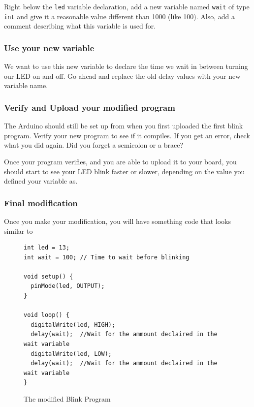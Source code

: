 \documentclass[11pt,a4paper]{article}
\begin{document}
Right below the \texttt{led} variable declaration, add a new variable named \texttt{wait} of type \texttt{int} and give it a reasonable value different than 1000 (like 100).  Also, add a comment describing what this variable is used for.

\subsubsection{Use your new variable} %
\label{ssub:use_your_new_variable}

We want to use this new variable to declare the time we wait in between turning our LED on and off.  Go ahead and replace the old delay values with your new variable name.  


\subsubsection{Verify and Upload your modified program} %
\label{ssub:verify_and_upload_your_modified_program}

The Arduino should still be set up from when you first uploaded the first blink program.  Verify your new program to see if it compiles.  If you get an error, check what you did again.  Did you forget a semicolon or a brace?

Once your program verifies, and you are able to upload it to your board, you should start to see your LED blink faster or slower, depending on the value you defined your variable as.


\subsubsection{Final modification} %
\label{ssub:final_modification}

Once you make your modification, you will have something code that looks similar to 
\begin{figure}[htbp]
	\centering
\begin{verbatim}
int led = 13;
int wait = 100; // Time to wait before blinking

void setup() {                
  pinMode(led, OUTPUT);     
}

void loop() {
  digitalWrite(led, HIGH);   
  delay(wait);  //Wait for the ammount declaired in the wait variable         
  digitalWrite(led, LOW);    
  delay(wait);  //Wait for the ammount declaired in the wait variable        
}
\end{verbatim}
	\caption{The modified Blink Program}
	\label{fig:blinkmod}
\end{figure}
\end{document}
